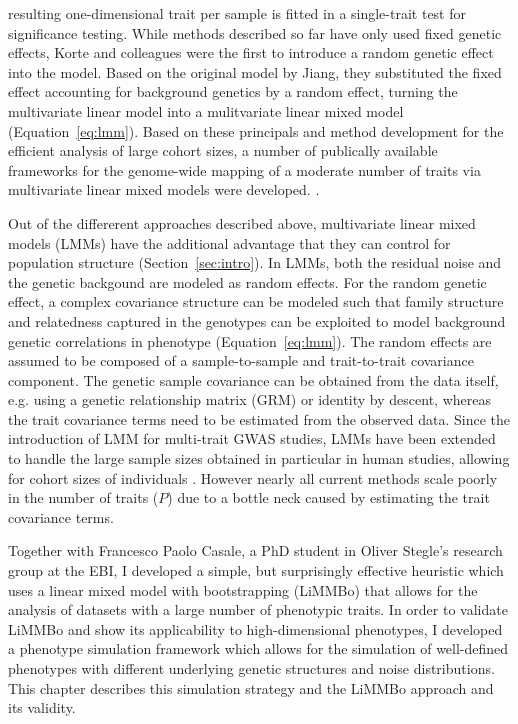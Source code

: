 resulting one-dimensional trait per sample is fitted in a single-trait test for significance testing.  While methods described so far have only used fixed genetic effects, Korte and colleagues \citeyear{Korte2012} were the first to introduce a random genetic effect into the model. Based on the original model by Jiang, they substituted the fixed effect accounting for background genetics by a random effect, turning the multivariate linear model into a mulitvariate linear mixed model (Equation~\ref{eq:lmm}). Based on these principals and method development for the efficient analysis of large cohort sizes, a number of publically available frameworks for the genome-wide mapping of a moderate number of traits via multivariate linear mixed models were developed. \citep{Korte2012,Yang2011,Lippert2014,Zhou2014,Casale2015}. 

Out of the differerent approaches described above, multivariate linear mixed models (LMMs) have the additional advantage that they can control for population structure (Section~\ref{sec:intro}). In LMMs, both the residual noise and the genetic backgound are modeled as random effects. For the random genetic effect, a complex covariance structure can be modeled such that family structure and relatedness captured in the genotypes can be exploited to model background genetic correlations in phenotype\citep{Yu2006,Kang2008} (Equation~\ref{eq:lmm}). The random effects are assumed to be composed of a sample-to-sample and trait-to-trait covariance component. The genetic sample covariance can be obtained from the data itself, e.g. using a genetic relationship matrix (GRM) or identity by descent, whereas the trait covariance terms need to be estimated from the observed data. Since the introduction of LMM for multi-trait GWAS studies, LMMs have been extended to handle the large sample sizes obtained in particular in human studies, allowing for cohort sizes of   individuals \citep{Zhou2014}. However nearly all current methods scale poorly in the number of traits ($P$) due to a bottle neck caused by estimating the trait covariance terms. 

Together with Francesco Paolo Casale, a PhD student in Oliver Stegle's research group at the EBI, I developed a simple, but surprisingly effective heuristic which uses a linear mixed model with bootstrapping (LiMMBo) that allows for the analysis of datasets with a large number of phenotypic traits. In order to validate LiMMBo and show its applicability to high-dimensional phenotypes, I developed a phenotype simulation framework which allows for the simulation of well-defined phenotypes with different underlying genetic structures and noise distributions. This chapter describes this simulation strategy and the LiMMBo approach and its validity. 

